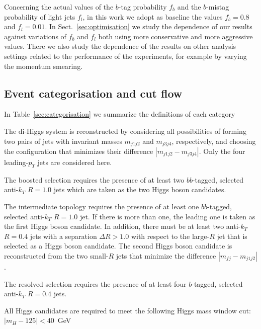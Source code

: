 Concerning the actual values of the $b$-tag probability $f_b$ and
the $b$-mistag probability of light jets $f_l$, in this work
we adopt as baseline the values $f_b=0.8$ and $f_l=0.01$.
%
In Sect.~\ref{sec:optimisation} we study the dependence of
our results against variations of $f_b$ and $f_l$ both
using more conservative and more aggressive values.
%
There we also study the dependence of the results
on other analysis settings related to the performance of
the experiments, for example by varying the momentum smearing.

\subsection{Event categorisation and cut flow}

In Table~\ref{sec:categorisation} we summarize the definitions of each
category


The di-Higgs system is reconstructed by considering all possibilities of forming two pairs of jets with invariant masses $m_{j1j2}$ and 
$m_{j3j4}$, respectively, and choosing the configuration that minimizes their difference $|m_{j1j2} - m_{j3j4}|$. Only the four leading-$p_T$ jets
are considered here.


The boosted selection requires the presence of at least two $bb$-tagged, selected anti-$k_T$ $R=1.0$ jets which are taken as the two Higgs boson candidates.


The intermediate topology requires the presence of at least one $bb$-tagged, selected anti-$k_T$ $R = 1.0$ jet. If there is more than one, the leading one is taken as the first Higgs boson candidate. In addition, there must be at least two anti-$k_T$ $R=0.4$ jets with a separation $\Delta R > 1.0$ with respect to the large-$R$ jet
that is selected as a Higgs boson candidate. The second Higgs boson candidate is reconstructed from the two small-$R$ jets that minimize the difference $|m_{fj} - m_{j1j2}|$.


The resolved selection requires the presence of at least four $b$-tagged, selected anti-$k_T$ $R=0.4$ jets.

All Higgs candidates are required to meet the following Higgs mass window cut: $|m_{H} - 125| < 40$~GeV


